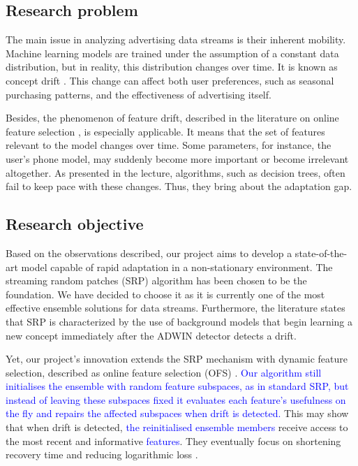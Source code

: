 \documentclass[12pt]{article}
\newcommand{\new}[1]{\textcolor{blue}{#1}}
\begin{document}
\subsection{Research problem}

The main issue in analyzing advertising data streams is their inherent mobility. Machine learning models are trained under the assumption of a constant data distribution, but in reality, this distribution changes over time. It is known as concept drift \cite{gama2014survey}. This change can affect both user preferences, such as seasonal purchasing patterns, and the effectiveness of advertising itself.


Besides, the phenomenon of feature drift, described in the literature on online feature selection \cite{li2013group}, is especially applicable. It means that the set of features relevant to the model changes over time. Some parameters, for instance, the user's phone model, may suddenly become more important or become irrelevant altogether. As presented in the lecture, algorithms, such as decision trees, often fail to keep pace with these changes. Thus, they bring about the adaptation gap.


\subsection{Research objective}

Based on the observations described, our project aims to develop a state-of-the-art model capable of rapid adaptation in a non-stationary environment. The streaming random patches (SRP) algorithm \cite{gomes2019streaming} has been chosen to be the foundation. We have decided to choose it as it is currently one of the most effective ensemble solutions for data streams. Furthermore, the literature states that SRP is characterized by the use of background models that begin learning a new concept immediately after the ADWIN detector detects a drift.

Yet, our project's innovation extends the SRP mechanism with dynamic feature selection, described as online feature selection (OFS) \cite{liu2022adaptation}. \new{Our algorithm still initialises the ensemble with random feature subspaces, as in standard SRP, but instead of leaving these subspaces fixed it evaluates each feature's usefulness on the fly and repairs the affected subspaces when drift is detected.} This may show that when drift is detected, \new{the reinitialised ensemble members} receive access to the most recent and informative \new{features}. They eventually focus on shortening recovery time and reducing logarithmic loss \cite{vovk2015fundamental}.
\end{document}
